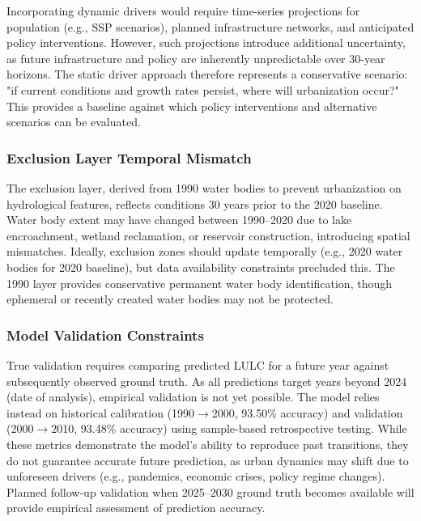 \documentclass[12pt,a4paper]{article}
\begin{document}
Incorporating dynamic drivers would require time-series projections for population (e.g., SSP scenarios), planned infrastructure networks, and anticipated policy interventions. However, such projections introduce additional uncertainty, as future infrastructure and policy are inherently unpredictable over 30-year horizons. The static driver approach therefore represents a conservative scenario: "if current conditions and growth rates persist, where will urbanization occur?" This provides a baseline against which policy interventions and alternative scenarios can be evaluated.

\subsubsection{Exclusion Layer Temporal Mismatch}

The exclusion layer, derived from 1990 water bodies to prevent urbanization on hydrological features, reflects conditions 30 years prior to the 2020 baseline. Water body extent may have changed between 1990--2020 due to lake encroachment, wetland reclamation, or reservoir construction, introducing spatial mismatches. Ideally, exclusion zones should update temporally (e.g., 2020 water bodies for 2020 baseline), but data availability constraints precluded this. The 1990 layer provides conservative permanent water body identification, though ephemeral or recently created water bodies may not be protected.

\subsubsection{Model Validation Constraints}

True validation requires comparing predicted LULC for a future year against subsequently observed ground truth. As all predictions target years beyond 2024 (date of analysis), empirical validation is not yet possible. The model relies instead on historical calibration (1990$\rightarrow$2000, 93.50\% accuracy) and validation (2000$\rightarrow$2010, 93.48\% accuracy) using sample-based retrospective testing. While these metrics demonstrate the model's ability to reproduce past transitions, they do not guarantee accurate future prediction, as urban dynamics may shift due to unforeseen drivers (e.g., pandemics, economic crises, policy regime changes). Planned follow-up validation when 2025--2030 ground truth becomes available will provide empirical assessment of prediction accuracy.
\end{document}
